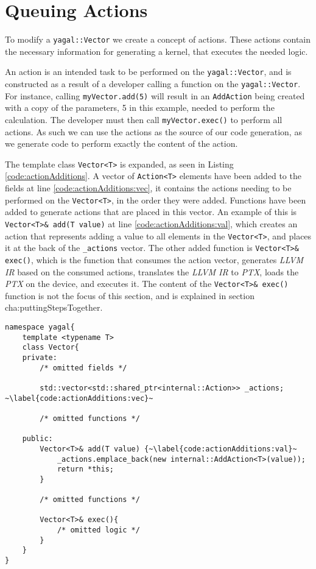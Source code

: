 \section{Queuing Actions} \label{cha:queueingActions}
To modify a \texttt{yagal::Vector} we create a concept of actions. These actions contain the necessary information for generating a kernel, that executes the needed logic.

An action is an intended task to be performed on the \texttt{yagal::Vector}, and is constructed as a result of a developer calling a function on the \texttt{yagal::Vector}. For instance, calling \texttt{myVector.add(5)} will result in an \texttt{AddAction} being created with a copy of the parameters, 5 in this example, needed to perform the calculation. The developer must then call \texttt{myVector.exec()} to perform all actions. As such we can use the actions as the source of our code generation, as we generate code to perform exactly the content of the action.

The template class \texttt{Vector<T>} is expanded, as seen in Listing \ref{code:actionAdditions}. A vector of \texttt{Action<T>} elements have been added to the fields at line \ref{code:actionAdditions:vec}, it contains the actions needing to be performed on the \texttt{Vector<T>}, in the order they were added. Functions have been added to generate actions that are placed in this vector. An example of this is \texttt{Vector<T>\& add(T value)} at line \ref{code:actionAdditions:val}, which creates an action that represents adding a value to all elements in the \texttt{Vector<T>}, and places it at the back of the \texttt{\_actions} vector. The other added function is \texttt{Vector<T>\& exec()}, which is the function that consumes the action vector, generates \textit{LLVM IR} based on the consumed actions, translates the \textit{LLVM IR} to \textit{PTX}, loads the \textit{PTX} on the device, and executes it. The content of the \texttt{Vector<T>\& exec()} function is not the focus of this section, and is explained in section {cha:puttingStepsTogether}.

\begin{lstlisting}[caption={Vector<T> action additions}, label={code:actionAdditions}]
namespace yagal{
    template <typename T>
    class Vector{
    private:
        /* omitted fields */

        std::vector<std::shared_ptr<internal::Action>> _actions; ~\label{code:actionAdditions:vec}~

        /* omitted functions */
    
    public:
        Vector<T>& add(T value) {~\label{code:actionAdditions:val}~
            _actions.emplace_back(new internal::AddAction<T>(value));
            return *this;
        }
        
        /* omitted functions */

        Vector<T>& exec(){
            /* omitted logic */
        }
    }
}
\end{lstlisting}

